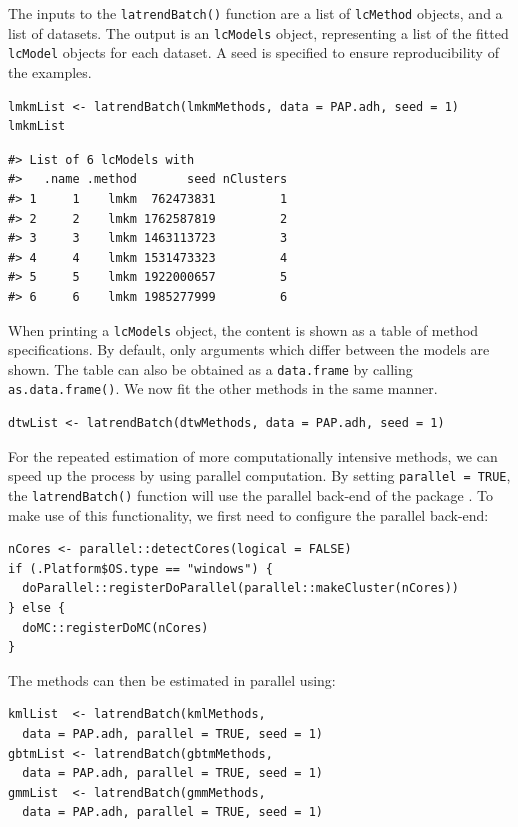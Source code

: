 The inputs to the \texttt{latrendBatch()} function are a list of \texttt{lcMethod} objects, and a list of datasets. The output is an \texttt{lcModels} object, representing a list of the fitted \texttt{lcModel} objects for each dataset. A seed is specified to ensure reproducibility of the examples.

\begin{verbatim}
lmkmList <- latrendBatch(lmkmMethods, data = PAP.adh, seed = 1)
lmkmList
\end{verbatim}

\begin{verbatim}
#> List of 6 lcModels with
#>   .name .method       seed nClusters
#> 1     1    lmkm  762473831         1
#> 2     2    lmkm 1762587819         2
#> 3     3    lmkm 1463113723         3
#> 4     4    lmkm 1531473323         4
#> 5     5    lmkm 1922000657         5
#> 6     6    lmkm 1985277999         6
\end{verbatim}

When printing a \texttt{lcModels} object, the content is shown as a table of method specifications. By default, only arguments which differ between the models are shown. The table can also be obtained as a \texttt{data.frame} by calling \texttt{as.data.frame()}. We now fit the other methods in the same manner.

\begin{verbatim}
dtwList <- latrendBatch(dtwMethods, data = PAP.adh, seed = 1)
\end{verbatim}

For the repeated estimation of more computationally intensive methods, we can speed up the process by using parallel computation. By setting \texttt{parallel\ =\ TRUE}, the \texttt{latrendBatch()} function will use the parallel back-end of the  package \citep{weston2022foreach}. To make use of this functionality, we first need to configure the parallel back-end:

\begin{verbatim}
nCores <- parallel::detectCores(logical = FALSE)
if (.Platform$OS.type == "windows") {
  doParallel::registerDoParallel(parallel::makeCluster(nCores))
} else {
  doMC::registerDoMC(nCores)
}
\end{verbatim}

The methods can then be estimated in parallel using:

\begin{verbatim}
kmlList  <- latrendBatch(kmlMethods,
  data = PAP.adh, parallel = TRUE, seed = 1)
gbtmList <- latrendBatch(gbtmMethods,
  data = PAP.adh, parallel = TRUE, seed = 1)
gmmList  <- latrendBatch(gmmMethods,
  data = PAP.adh, parallel = TRUE, seed = 1)
\end{verbatim}

